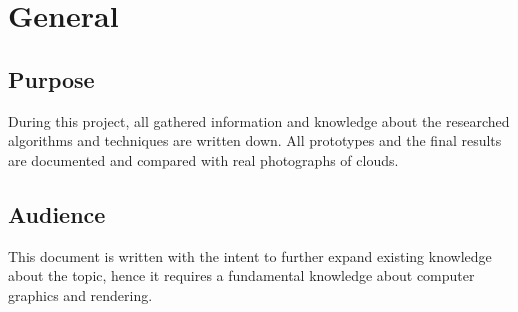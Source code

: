 \section{General}

\subsection{Purpose}
During this project, all gathered information and knowledge about the researched algorithms and techniques are written down. All prototypes and the final results are documented and compared with real photographs of clouds.

\subsection{Audience}
This document is written with the intent to further expand existing knowledge about the topic, hence it requires a fundamental knowledge about computer graphics and rendering.

